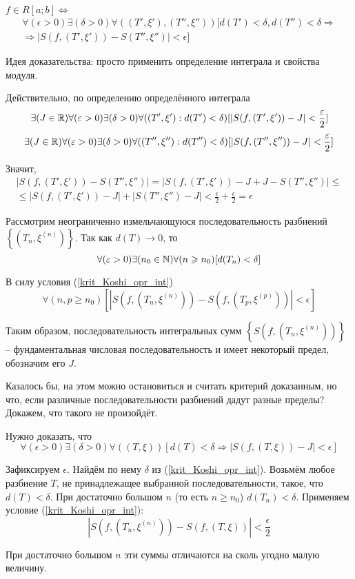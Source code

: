 \begin{teorema}
$f\in R[a;b] \Leftrightarrow $
\begin{multline}\label{krit_Koshi_opr_int}
\forall(\epsilon>0)\exists(\delta>0)\forall((T',\xi'),(T'',\xi''))[d(T')<\delta, d(T'')<\delta \Rightarrow
\\ \Rightarrow
 |S(f,(T',\xi'))-S(T'',\xi'')|<\epsilon]
\end{multline}
\end{teorema}

\dokvo
\neobh
Идея доказательства: просто применить определение интеграла и свойства модуля.

Действительно, по определению определённого интеграла
$$
\exists(J\in \mathbb{R})\forall(\varepsilon>0)\exists(\delta>0)\forall((T',\xi'):d(T')<\delta)[|S(f,(T',\xi'))-J|<\frac{\varepsilon}{2}]
$$
$$
\exists(J\in \mathbb{R})\forall(\varepsilon>0)\exists(\delta>0)\forall((T'',\xi''):d(T'')<\delta)[|S(f,(T'',\xi''))-J|<\frac{\varepsilon}{2}]
$$

Значит, 
\begin{multline*}
|S(f,(T',\xi'))-S(T'',\xi'')|= |S(f,(T',\xi'))-J+J-S(T'',\xi'')|\leq
\\ \leq
|S(f,(T',\xi'))-J|+|S(T'',\xi'')-J|<\frac\epsilon{2}+\frac\epsilon{2}=\epsilon
\end{multline*}
\dokno

\dost

Рассмотрим неограниченно измельчающуюся последовательность разбиений $\left\{\left(T_n,\xi^{(n)}\right)\right\}$.
Так как $d(T)\to 0$, то
$$
\forall(\varepsilon>0)\exists(n_0\in\mathbb{N})\forall(n\geqslant n_0)[d(T_n)<\delta]
$$

В силу условия (\ref{krit_Koshi_opr_int})
$$
\forall(n,p\geq n_0)\left[\left|S\left(f,\left(T_n,\xi^{(n)}\right)\right)-S\left(f,\left(T_p,\xi^{(p)}\right)\right)\right|<\epsilon\right]
$$

Таким образом, последовательность интегральных сумм $\left\{S\left(f,\left(T_n,\xi^{(n)}\right)\right)\right\}$ -- фундаментальная числовая последовательность и имеет некоторый предел, обозначим его $J$.

Казалось бы, на этом можно остановиться и считать критерий доказанным, но что, если различные последовательности разбиений дадут разные пределы?
Докажем, что такого не произойдёт.

Нужно доказать, что
$$
\forall(\epsilon>0)\exists(\delta>0)\forall((T,\xi))[d(T)<\delta \Rightarrow |S(f,(T,\xi))-J|<\epsilon]
$$

Зафиксируем $\epsilon$.
Найдём по нему $\delta$ из (\ref{krit_Koshi_opr_int}).
Возьмём любое разбиение $T$, не принадлежащее выбранной последовательности, такое, что $d(T)<\delta$.
При достаточно большом $n$ (то есть $n\geq n_0$) $d(T_n)<\delta$.
Применяем условие (\ref{krit_Koshi_opr_int}):
$$
\left|S\left(f,\left(T_n,\xi^{(n)}\right)\right)-S\left(f,\left(T,\xi\right)\right)\right|<\frac\epsilon{2}
$$

При достаточно большом $n$ эти суммы отличаются на сколь угодно малую величину.

\dokno




